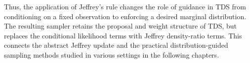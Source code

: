 Thus, the application of Jeffrey's rule changes the role of guidance in TDS from conditioning on a fixed observation to enforcing a desired marginal distribution. The resulting sampler retains the proposal and weight structure of TDS, but replaces the conditional likelihood terms with Jeffrey density-ratio terms. This connects the abstract Jeffrey update and the practical distribution-guided sampling methods studied in various settings in the following chapters.
